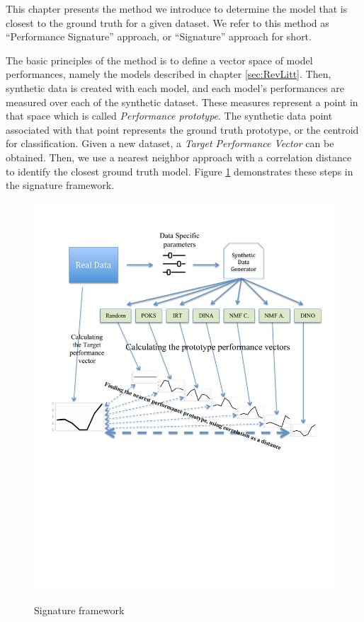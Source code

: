 \label{sec:Approach}

This chapter presents the method we introduce to determine the model that is closest to the ground truth for a given dataset. We refer to this method as ``Performance Signature'' approach, or ``Signature'' approach for short. 

The basic principles of the method is to define a vector space of model performances, namely the models described in chapter \ref{sec:RevLitt}. Then, synthetic data is created with each model, and each model's performances are measured over each of the synthetic dataset. These measures represent a point in that space which is called \textit{Performance prototype}. The synthetic data point associated with that point represents the ground truth prototype, or the centroid for classification. Given a new dataset, a \textit{Target Performance Vector} can be obtained. Then, we use a nearest neighbor approach with a correlation distance to identify the closest ground truth model. Figure \ref{SignatureFrameworkNew} demonstrates these steps in the signature framework.

\begin{figure}[h]
\centering
{\includegraphics[trim=1cm 10cm 1cm 1cm,scale=0.7]{images/Approach4.pdf}}
\caption{Signature framework}
\label{SignatureFrameworkNew}
\end{figure}


